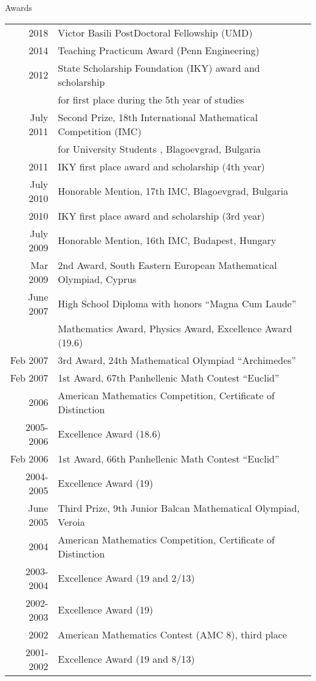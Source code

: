 \documentclass{resume} %
\begin{document}
\pagebreak


\begin{rSection}{Awards}

  \begin{longtable}{rl}
  2018 & Victor Basili PostDoctoral Fellowship (UMD)\\
  2014	 & Teaching Practicum Award (Penn Engineering) \\
  2012 & State Scholarship Foundation (IKY) award and scholarship \\
       & for first place during the 5th year of studies \\
  July  2011  &  Second  Prize,  18th  International Mathematical Competition (IMC) \\
  &  for University Students , Blagoevgrad, Bulgaria \\
  2011 & IKY first place award and scholarship (4th year)\\
  July 2010 &  Honorable Mention,  17th IMC, Blagoevgrad, Bulgaria \\
  2010 & IKY first place award and scholarship (3rd year)\\
  July 2009 &  Honorable Mention,  16th IMC, Budapest, Hungary\\
  Mar 2009  &  2nd Award, South Eastern European Mathematical Olympiad, Cyprus\\

  June  2007 &   High  School  Diploma with  honors  “Magna  Cum  Laude”\\
             &   Mathematics Award, Physics Award,  Excellence Award (19.6)\\
  Feb 2007 &  3rd Award, 24th Mathematical Olympiad “Archimedes”\\
  Feb 2007 &  1st Award, 67th Panhellenic Math Contest “Euclid”\\
  2006 &  American Mathematics Competition, Certificate of Distinction\\
  2005-2006 &  Excellence Award (18.6)\\
  Feb 2006 &  1st Award, 66th Panhellenic Math Contest “Euclid”\\
  2004-2005 &  Excellence Award (19)\\
  June 2005 &  Third Prize, 9th Junior Balcan Mathematical Olympiad, Veroia\\
  2004 &  American Mathematics Competition, Certificate of Distinction\\
  2003-2004&  Excellence Award (19 and 2/13)\\
  2002-2003&  Excellence Award (19)\\
  2002 & American Mathematics Contest (AMC 8), third place\\
  2001-2002&  Excellence Award (19 and 8/13)\\
  

\end{longtable}
\end{rSection}
\end{document}
